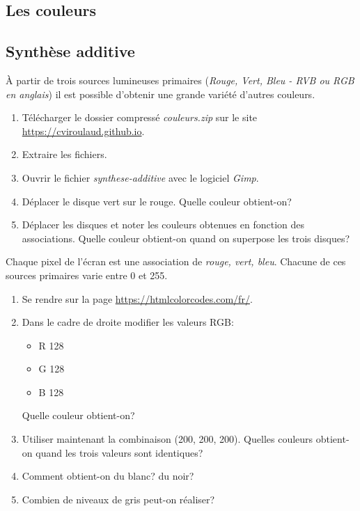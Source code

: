 \documentclass[a4paper,11pt]{article}
\begin{document}
\begin{Form}
\section{Les couleurs}
\subsection{Synthèse additive}
À partir de trois sources lumineuses primaires (\emph{Rouge, Vert, Bleu - RVB ou RGB en anglais}) il est possible d'obtenir une grande variété d'autres couleurs.
\begin{activite}
\begin{enumerate}
\item Télécharger le dossier compressé \emph{couleurs.zip} sur le site \mbox{\url{https://cviroulaud.github.io}}.
\item Extraire les fichiers.
\item Ouvrir le fichier \emph{synthese-additive} avec le logiciel \emph{Gimp}.
\item Déplacer le disque vert sur le rouge. Quelle couleur obtient-on?
\item Déplacer les disques et noter les couleurs obtenues en fonction des associations. Quelle couleur obtient-on quand on superpose les trois disques?
\end{enumerate}
\end{activite}
\begin{aretenir}[]
Chaque pixel de l'écran est une association de \emph{rouge, vert, bleu}. Chacune de ces sources primaires varie entre 0 et 255.
\end{aretenir}
\begin{activite}
\begin{enumerate}
\item Se rendre sur la page \url{https://htmlcolorcodes.com/fr/}.
\item Dans le cadre de droite modifier les valeurs RGB:
\begin{itemize}
\item R 128
\item G 128
\item B 128
\end{itemize}
Quelle couleur obtient-on?
\item Utiliser maintenant la combinaison (200, 200, 200). Quelles couleurs obtient-on quand les trois valeurs sont identiques?
\item Comment obtient-on du blanc? du noir?
\item Combien de niveaux de gris peut-on réaliser?
\end{enumerate}
\end{activite}

\end{Form}
\end{document}
